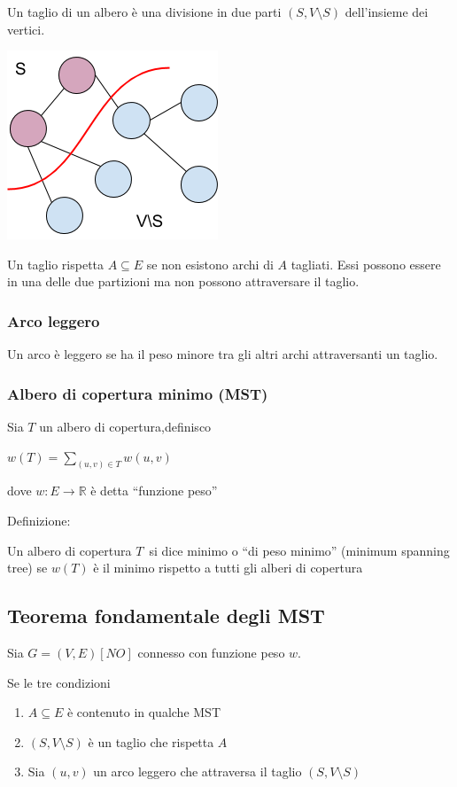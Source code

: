 \documentclass[11pt,a4paper,twoside,openright]{book}
\providecommand{\tightlist}{\setlength{\itemsep}{0pt}\setlength{\parskip}{0pt}}
\begin{document}
{{{Un taglio di un albero è una divisione in due parti $(S,V\setminus S)$ dell'insieme dei vertici.}

{\includegraphics{images/image527.png}}

{Un taglio rispetta $A \subseteq E$ se non esistono archi di $A$ tagliati. Essi possono essere in una delle due partizioni ma non possono attraversare il taglio.}

\subsubsection{Arco leggero}

{Un arco è leggero se ha il peso minore tra gli altri archi attraversanti un taglio.}

\subsubsection{Albero di copertura minimo (MST)}

{Sia $T$ un albero di copertura,definisco}

$w(T) = \sum_{(u,v)\in T}{w(u,v)}$

{dove $w:E\rightarrow \mathbb{R}$ è detta ``funzione peso''}

{Definizione:}

{Un albero di copertura }$T${~si dice minimo o ``di peso minimo'' (minimum spanning tree) se $w(T)$ è il minimo rispetto a tutti gli alberi di copertura}

\subsection{Teorema fondamentale degli MST}

{Sia $G=(V,E) [NO]$ connesso con funzione peso $w$.}

{Se le tre condizioni}

\begin{enumerate}
\tightlist
\item
  {$A \subseteq E$ è contenuto in qualche MST}
\item
  {$(S,V \setminus S)$ è un taglio che rispetta $A$}
\item
  {Sia $(u,v)$ un arco leggero che attraversa il taglio $(S,V \setminus S)$}
\end{enumerate}

}}
\end{document}
